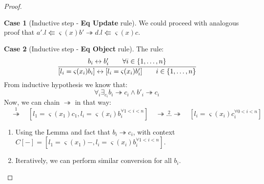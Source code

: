 \documentclass[a4paper,11pt]{article}
\theoremstyle{definition}
\newtheorem{case}{Case}
\begin{document}
\begin{proof}
\begin{case}[Inductive step - \textbf{Eq Update} rule]
  We could proceed with analogous proof that $a'.l \Lleftarrow \varsigma(x)b' \twoheadrightarrow d.l \Lleftarrow \varsigma(x)c$.
 \end{case}
 
 \begin{case}[Inductive step - \textbf{Eq Object} rule] The rule: \\
  \begin{equation*}
   \cfrac{b_i \leftrightarrow b_i' \qquad \forall i \in \{1,\dots,n\}}{[l_i = \varsigma(x_i)b_i] \leftrightarrow [l_i = \varsigma(x_i)b'_i] \qquad i \in \{1,\dots,n\}}
  \end{equation*}
  From inductive hypothesis we know that:
  \begin{equation*}
   \forall_i \exists_{c_i} b_i \twoheadrightarrow c_i \wedge b'_i \twoheadrightarrow c_i
  \end{equation*}
  Now, we can chain $\twoheadrightarrow$ in that way:
  \begin{equation*}
   [l_i = \varsigma(x_i)b_i^{\forall 0 < i < n}] \quad \stackrel{1}{\twoheadrightarrow} \quad
   [l_1 = \varsigma(x_1)c_1, l_i = \varsigma(x_i)b_i^{\forall 1 < i < n}] \quad \twoheadrightarrow \stackrel{2}{\dots} \twoheadrightarrow \quad
   [l_i = \varsigma(x_i)c_i^{\forall 0 < i < n}]
  \end{equation*}
  \begin{enumerate}
   \item Using the Lemma and fact that $b_i \twoheadrightarrow c_i$, with context $C[-] = [l_1=\varsigma(x_1)-, l_i = \varsigma(x_i)b_i^{\forall 1 < i < n}]$.
   \item Iteratively, we can perform similar conversion for all $b_i$.
  \end{enumerate}

 \end{case}
 
\end{proof}
\end{document}
